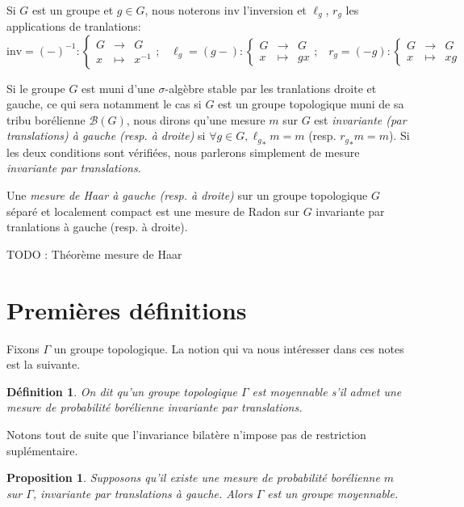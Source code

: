 \documentclass[a4paper,12pt]{article}
\newtheorem{proposition}[theorem]{Proposition}
\newtheorem{definition}[theorem]{Définition}
\newcommand{\Bor}{\mathcal{B}}
\newcommand\fundef[3]{#1: \left\{\begin{array}{ccc}#2\\#3\end{array}\right.}
\newcommand{\inv}{^{-1}}
\newcommand{\blank}{{-}}
\newcommand{\invop}{\mathrm{inv}}
\newcommand{\TODO}[1]{{\color{red}TODO :} #1}
\begin{document}
\paragraph{}
Si $G$ est un groupe et $g\in G$, nous noterons $\invop$ l'inversion et $\ell_g$, $r_g$ les applications de tranlations:
\begin{equation*}
    \fundef{\invop = (\blank)\inv}{G&\to& G}{x&\mapsto& x\inv}\text{;}\quad\fundef{\ell_g=(g\blank)}{G&\to& G}{x&\mapsto& gx}\text{;}\quad\fundef{r_g=(\blank g)}{G&\to& G}{x&\mapsto& xg}
\end{equation*}

Si le groupe $G$ est muni d'une $\sigma$-algèbre stable par les tranlations droite et gauche, ce qui sera notamment le cas
si $G$ est un groupe topologique muni de sa tribu borélienne $\Bor(G)$, nous dirons qu'une mesure $m$ sur $G$ est \textit{invariante
(par translations) à gauche (resp. à droite)} si $\forall g\in G, {\ell_g}_*m = m$ (resp. ${r_g}_*m = m$). Si les deux conditions
sont vérifiées, nous parlerons simplement de mesure \textit{invariante par translations}.

Une \textit{mesure de Haar à gauche (resp. à droite)} sur un groupe topologique $G$ séparé et localement compact est une mesure de
Radon sur $G$ invariante par tranlations à gauche (resp. à droite).

\TODO{Théorème mesure de Haar}

\section{Premières définitions}

Fixons $\Gamma$ un groupe topologique. La notion qui va nous intéresser dans ces notes est la suivante.

\begin{definition}
    On dit qu'un groupe topologique $\Gamma$ est \emph{moyennable} s'il admet une 
    mesure de probabilité borélienne invariante par translations.
\end{definition}

Notons tout de suite que l'invariance bilatère n'impose pas de restriction suplémentaire. 
\begin{proposition}\label{bilateral_of_left}
    Supposons qu'il existe une mesure de probabilité borélienne $m$ sur $\Gamma$, invariante par translations à gauche.
    Alors $\Gamma$ est un groupe moyennable.
\end{proposition} 
\end{document}
